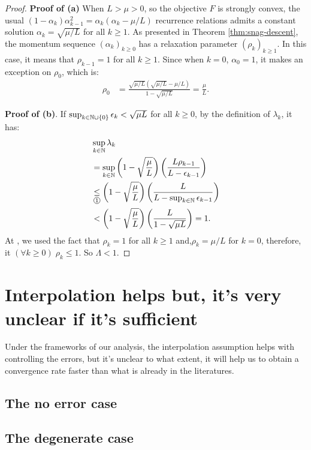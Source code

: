\documentclass[12pt]{article}
\begin{document}
\begin{proof}
            \par \textbf{Proof of (a)}
            When $L > \mu > 0$, so the objective $F$ is strongly convex, the usual $(1 - \alpha_k)\alpha_{k - 1}^2 = \alpha_k(\alpha_k - \mu/L)$ recurrence relations admits a constant solution $
            \alpha_k = \sqrt{\mu/L}$ for all $k \ge 1$. 
            As presented in Theorem \ref{thm:snag-descent}, the momentum sequence $(\alpha_k)_{k \ge 0}$ has a relaxation parameter $(\rho_k)_{k \ge 1}$. 
            In this case, it means that $\rho_{k - 1} = 1$ for all $k \ge 1$. 
            Since when $k = 0$, $\alpha_0 = 1$, it makes an exception on $\rho_0$, which is: 
            \begin{align*}
                \rho_0 &= \frac{\sqrt{\mu/L}\left(\sqrt{\mu/L} - \mu/L\right)}{1 - \sqrt{\mu/L}} = \frac{\mu}{L}. 
            \end{align*}
            \par \textbf{Proof of (b)}.
            If $\sup_{k \in \mathbb N \cup \{0\}}\epsilon_{k} < \sqrt{\mu L}$ for all $k \ge 0$, by the definition of $\lambda_k$, it has: 
            \begin{align*}
                & \sup_{k \in \N}\lambda_k
                \\
                &= \sup_{k \in \N} \left(
                    1 - \sqrt{\frac{\mu}{L}}
                \right)\left(
                    \frac{L\rho_{k - 1}}{L - \epsilon_{k - 1}}
                \right)
                \\
                &\underset{\circled{1}}{\le} 
                \left(
                    1 - \sqrt{\frac{\mu}{L}}
                \right)\left(
                    \frac{L}{L - \sup_{k \in \N}\epsilon_{k - 1}}
                \right)
                \\
                &< \left(
                    1 - \sqrt{\frac{\mu}{L}}
                \right)\left(
                    \frac{L}{1 - \sqrt{\mu L}}
                \right) = 1. 
            \end{align*}
            At , we used the fact that $\rho_k = 1$ for all $k \ge 1$ and,$\rho_k = \mu/L$ for $k = 0$, therefore, it $(\forall k \ge 0)\; \rho_k \le 1$. 
            So $\Lambda < 1$. 
            
        \end{proof}


\section{Interpolation helps but, it's very unclear if it's sufficient}
    Under the frameworks of our analysis, the interpolation assumption helps with controlling the errors, but it's unclear to what extent, it will help us to obtain a convergence rate faster than what is already in the literatures. 
    \subsection{The no error case}
    \subsection{The degenerate case}




\end{document}
